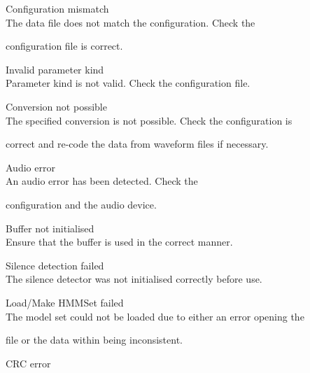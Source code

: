 \begin{itemize}
\begin{itemize}
    Configuration mismatch\\


        The data file does not match the configuration.  Check the 


        configuration file is correct.





    Invalid parameter kind\\


        Parameter kind is not valid.  Check the configuration file.





    Conversion not possible\\


        The specified conversion is not possible.  Check the configuration is


        correct and re-code the data from waveform files if necessary.





    Audio error\\


        An audio error has been detected.  Check the  


        configuration and the audio device.





    Buffer not initialised\\


        Ensure that the buffer is used in the correct manner.





    Silence detection failed\\


        The silence detector was not initialised correctly before use.





    Load/Make HMMSet failed\\


        The model set could not be loaded due to either an error opening the


        file or the data within being inconsistent.





    CRC error\\



\end{itemize}
\end{itemize}
